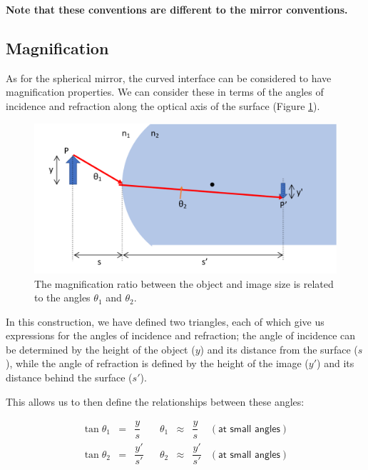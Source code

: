 \documentclass[
]{book}
\begin{document}
\textbf{Note that these conventions are different to the mirror conventions.}

\hypertarget{sec-ch16-magnificationcurvedsurface1}{%
\subsection{Magnification}\label{sec-ch16-magnificationcurvedsurface1}}

As for the spherical mirror, the curved interface can be considered to have magnification properties. We can consider these in terms of the angles of incidence and refraction along the optical axis of the surface (Figure \ref{fig:ch16-sphericalsurfacemag1}).

\begin{figure}

{\centering \includegraphics[width=0.7\linewidth]{visualisations/LaTeX/ch16-sphericalsurfacemag1} 

}

\caption{The magnification ratio between the object and image size is related to the angles $\theta_1$ and $\theta_2$.}\label{fig:ch16-sphericalsurfacemag1}
\end{figure}

In this construction, we have defined two triangles, each of which give us expressions for the angles of incidence and refraction; the angle of incidence can be determined by the height of the object (\(y\)) and its distance from the surface (\(s\)), while the angle of refraction is defined by the height of the image (\(y'\)) and its distance behind the surface (\(s'\)).

This allows us to then define the relationships between these angles:

\begin{equation}
\begin{array}{rclcrcll}
\tan \theta_1 &=& \dfrac{y}{s} & & \theta_1 &\approx& \dfrac{y}{s} & (\textsf{at small angles}) \\
\tan \theta_2 &=& \dfrac{y'}{s'} & & \theta_2 &\approx& \dfrac{y'}{s'} & (\textsf{at small angles}) \\
\end{array}
\label{eq:ch16-sphericalsurfacemag1}
\end{equation}
\end{document}
